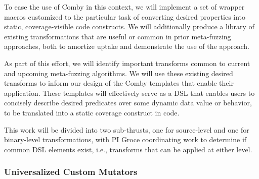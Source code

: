 To ease the use of Comby in this context, we will implement a set of wrapper
macros customized to the particular task of converting desired
properties into static, coverage-visible code constructs.  We will additionally
produce a library of existing transformations that are useful or common in prior
meta-fuzzing approaches, both to amortize uptake and demonstrate the use of the
approach.  

As part of this effort, we will identify important transforms common to current
and upcoming meta-fuzzing algorithms.  We will use these existing desired
transforms to inform our design of the Comby templates that enable their
application. These templates will effectively serve as a DSL that enables users
to concisely describe desired predicates over some dynamic data value or
behavior, to be translated into a static coverage construct in code. 




This work will be divided into two sub-thrusts, one for source-level and one 
for binary-level transformations, with PI Groce coordinating work to determine 
if common DSL elements exist, i.e., transforms that can be applied at either 
level.


\subsubsection{Universalized Custom Mutators}

